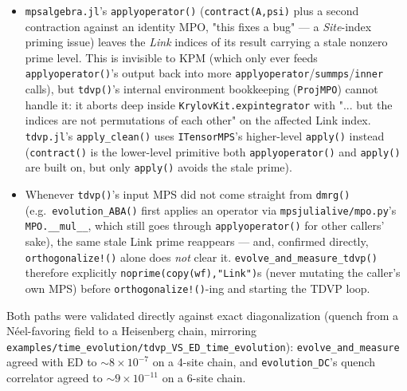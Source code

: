 \documentclass[11pt]{article}
\begin{document}
\begin{itemize}
\item \texttt{mpsalgebra.jl}'s \texttt{applyoperator()}
  (\texttt{contract(A,psi)} plus a second contraction against an
  identity MPO, "this fixes a bug" --- a \emph{Site}-index priming
  issue) leaves the \emph{Link} indices of its result carrying a stale
  nonzero prime level. This is invisible to KPM (which only ever feeds
  \texttt{applyoperator()}'s output back into more
  \texttt{applyoperator}/\texttt{summps}/\texttt{inner} calls), but
  \texttt{tdvp()}'s internal environment bookkeeping (\texttt{ProjMPO})
  cannot handle it: it aborts deep inside
  \texttt{KrylovKit.expintegrator} with "... but the indices are not
  permutations of each other" on the affected Link index.
  \texttt{tdvp.jl}'s \texttt{apply\_clean()} uses \texttt{ITensorMPS}'s
  higher-level \texttt{apply()} instead (\texttt{contract()} is the
  lower-level primitive both \texttt{applyoperator()} and
  \texttt{apply()} are built on, but only \texttt{apply()} avoids the
  stale prime).
\item Whenever \texttt{tdvp()}'s input MPS did not come straight from
  \texttt{dmrg()} (e.g.\ \texttt{evolution\_ABA()} first applies an
  operator via \texttt{mpsjulialive/mpo.py}'s \texttt{MPO.\_\_mul\_\_},
  which still goes through \texttt{applyoperator()} for other callers'
  sake), the same stale Link prime reappears --- and, confirmed
  directly, \texttt{orthogonalize!()} alone does \emph{not} clear it.
  \texttt{evolve\_and\_measure\_tdvp()} therefore explicitly
  \texttt{noprime(copy(wf),"Link")}s (never mutating the caller's own
  MPS) before \texttt{orthogonalize!()}-ing and starting the TDVP loop.
\end{itemize}

Both paths were validated directly against exact diagonalization (quench
from a N\'eel-favoring field to a Heisenberg chain, mirroring
\texttt{examples/time\_evolution/tdvp\_VS\_ED\_time\_evolution}):
\texttt{evolve\_and\_measure} agreed with ED to $\sim 8 \times 10^{-7}$
on a 4-site chain, and \texttt{evolution\_DC}'s quench correlator agreed
to $\sim 9 \times 10^{-11}$ on a 6-site chain.
\end{document}
